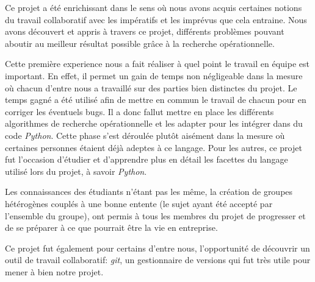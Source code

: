 Ce projet a été enrichissant dans le sens où nous avons acquis certaines
notions du travail collaboratif avec les impératifs et les imprévus que cela entraine.
Nous avons découvert et appris à travers ce projet, différents problèmes
pouvant aboutir au meilleur résultat possible grâce à la recherche opérationnelle.

Cette première experience nous a fait réaliser à quel point le travail
en équipe est important.
En effet, il permet un gain de temps non négligeable dans la mesure où
chacun d'entre nous a travaillé sur des parties bien distinctes du projet.
Le temps gagné a été utilisé afin de mettre en commun le travail de
chacun pour en corriger les éventuels bugs.
Il a donc fallut mettre en place les différents algorithmes de recherche
opérationnelle et les adapter pour les intégrer dans du code \emph{Python}.
Cette phase s'est déroulée plutôt aisément dans la mesure où certaines
personnes étaient déjà adeptes à ce langage.
Pour les autres, ce projet fut l'occasion d'étudier et d'apprendre
plus en détail les facettes du langage utilisé lors du projet,
à savoir \emph{Python}.

Les connaissances des étudiants n'étant pas les même,
la création de groupes hétérogènes couplés à une bonne entente
(le sujet ayant été accepté par l'ensemble du groupe),
ont permis à tous les membres du projet de progresser
et de se préparer à ce que pourrait être la vie en entreprise.

Ce projet fut également pour certains d'entre nous,
l'opportunité de découvrir un outil de travail collaboratif: \emph{git},
un gestionnaire de versions qui fut très utile pour mener
à bien notre projet.
